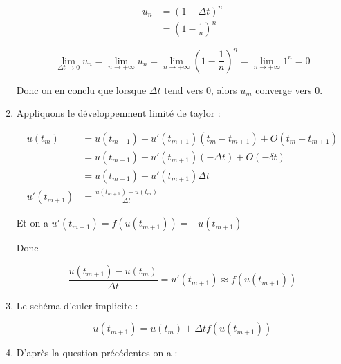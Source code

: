 \documentclass[12pt, letterpaper]{article}
\begin{document}
\begin{enumerate}
  \begin{equation*}
    \begin{split}
      u_n & = ( 1 - \Delta t )^n \\
      & = \left( 1 - \frac{1}{n} \right)^n
    \end{split}
  \end{equation*}

  \begin{equation*}
    \lim_{\Delta t \rightarrow 0} {u_n}
    =
    \lim_{n \rightarrow +\infty} {u_n}
    =
    \lim_{n \rightarrow +\infty} {\left( 1 - \frac{1}{n} \right)^n}
    =
    \lim_{n \rightarrow +\infty} {1^n}
    =
    0
  \end{equation*}

  Donc on en conclu que lorsque $\Delta t$ tend vers 0, alors $u_m$
  converge vers 0.

\item

  Appliquons le développenment limité de taylor :

  \begin{equation*}
    \begin{split}
      u(t_m) & = u(t_{m + 1}) + u'(t_{m+1}) (t_m - t_{m+1}) + O(t_m -
      t_{m+1}) \\
      & = u(t_{m + 1}) + u'(t_{m+1}) (- \Delta t) + O(- \delta t) \\
      & = u(t_{m + 1}) - u'(t_{m+1}) \Delta t \\
      u'(t_{m+1}) & = \frac{u(t_{m + 1}) - u(t_m)}{\Delta t}
    \end{split}
  \end{equation*}

  Et on a $u'(t_{m+1}) = f(u(t_{m+1})) = - u(t_{m+1})$

  Donc

  \begin{equation*}
    \frac{u(t_{m + 1}) - u(t_m)}{\Delta t} = u'(t_{m+1}) \approx
    f(u(t_{m+1}))
  \end{equation*}


\item
  Le schéma d'euler implicite :

  \begin{equation*}
    u(t_{m+1}) = u(t_m) + \Delta t f(u(t_{m+1}))
  \end{equation*}


\item

  D'après la question précédentes on a :


\end{enumerate}
\end{document}
